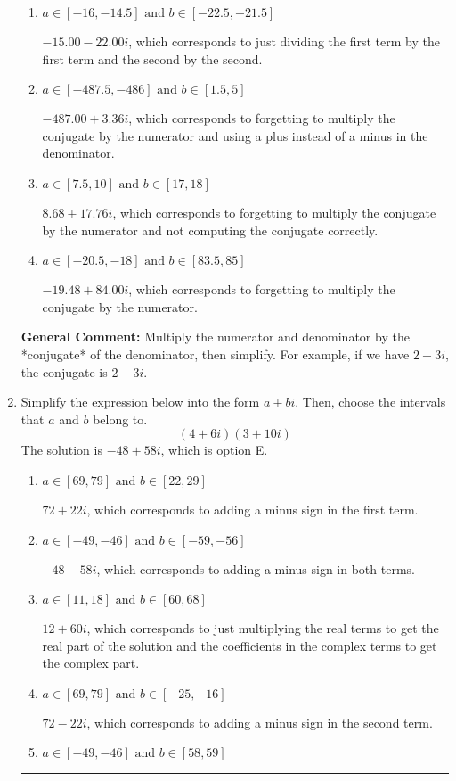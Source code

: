 \documentclass{extbook}[14pt]
\newcommand{\litem}[1]{\item #1

\rule{\textwidth}{0.4pt}}
\begin{document}
\begin{enumerate}
{\begin{enumerate}[label=\Alph*.]
* $-19.48  + 3.36 i$, which is the correct option.
\item \( a \in [-16, -14.5] \text{ and } b \in [-22.5, -21.5] \)

 $-15.00  - 22.00 i$, which corresponds to just dividing the first term by the first term and the second by the second.
\item \( a \in [-487.5, -486] \text{ and } b \in [1.5, 5] \)

 $-487.00  + 3.36 i$, which corresponds to forgetting to multiply the conjugate by the numerator and using a plus instead of a minus in the denominator.
\item \( a \in [7.5, 10] \text{ and } b \in [17, 18] \)

 $8.68  + 17.76 i$, which corresponds to forgetting to multiply the conjugate by the numerator and not computing the conjugate correctly.
\item \( a \in [-20.5, -18] \text{ and } b \in [83.5, 85] \)

 $-19.48  + 84.00 i$, which corresponds to forgetting to multiply the conjugate by the numerator.
\end{enumerate}

\textbf{General Comment:} Multiply the numerator and denominator by the *conjugate* of the denominator, then simplify. For example, if we have $2+3i$, the conjugate is $2-3i$.
}
\litem{
Simplify the expression below into the form $a+bi$. Then, choose the intervals that $a$ and $b$ belong to.
\[ (4 + 6 i)(3 + 10 i) \]The solution is \( -48 + 58 i \), which is option E.\begin{enumerate}[label=\Alph*.]
\item \( a \in [69, 79] \text{ and } b \in [22, 29] \)

 $72 + 22 i$, which corresponds to adding a minus sign in the first term.
\item \( a \in [-49, -46] \text{ and } b \in [-59, -56] \)

 $-48 - 58 i$, which corresponds to adding a minus sign in both terms.
\item \( a \in [11, 18] \text{ and } b \in [60, 68] \)

 $12 + 60 i$, which corresponds to just multiplying the real terms to get the real part of the solution and the coefficients in the complex terms to get the complex part.
\item \( a \in [69, 79] \text{ and } b \in [-25, -16] \)

 $72 - 22 i$, which corresponds to adding a minus sign in the second term.
\item \( a \in [-49, -46] \text{ and } b \in [58, 59] \)


\end{enumerate}}
\end{enumerate}
\end{document}
